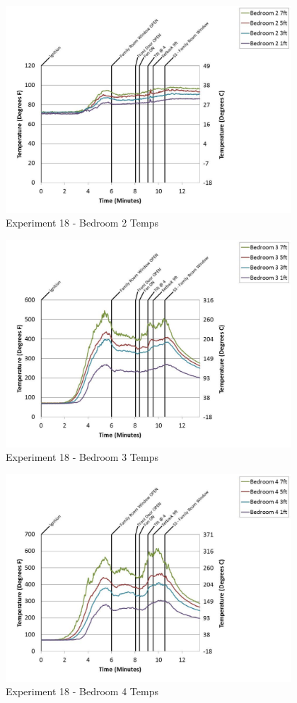 \documentclass{article}
\begin{document}
\begin{appendices}
	\begin{figure}[h!]
		\centering
		\includegraphics[height=3.05in]{0_Images/Results_Charts/Exp_18_Charts/Bedroom2Temps.pdf}
		\caption{Experiment 18 - Bedroom 2 Temps}
	\end{figure}
 
	\clearpage

	\begin{figure}[h!]
		\centering
		\includegraphics[height=3.05in]{0_Images/Results_Charts/Exp_18_Charts/Bedroom3Temps.pdf}
		\caption{Experiment 18 - Bedroom 3 Temps}
	\end{figure}
 

	\begin{figure}[h!]
		\centering
		\includegraphics[height=3.05in]{0_Images/Results_Charts/Exp_18_Charts/Bedroom4Temps.pdf}
		\caption{Experiment 18 - Bedroom 4 Temps}
	\end{figure}
 

\end{appendices}
\end{document}

